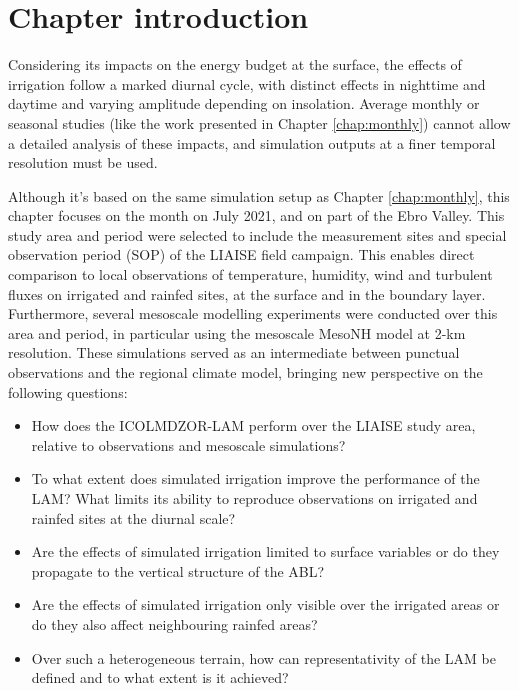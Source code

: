 \section{Chapter introduction}

Considering its impacts on the energy budget at the surface, the effects of irrigation follow a marked diurnal cycle, with distinct effects in nighttime and daytime and varying amplitude depending on insolation. 
Average monthly or seasonal studies (like the work presented in Chapter \ref{chap:monthly}) cannot allow a detailed analysis of these impacts, and simulation outputs at a finer temporal resolution must be used.

Although it's based on the same simulation setup as Chapter \ref{chap:monthly}, this chapter focuses on the month on July 2021, and on part of the Ebro Valley. This study area and period were selected to include the measurement sites and special observation period (SOP) of the LIAISE field campaign. This enables direct comparison to local observations of temperature, humidity, wind and turbulent fluxes on irrigated and rainfed sites, at the surface and in the boundary layer. Furthermore, several mesoscale modelling experiments were conducted over this area and period, in particular using the mesoscale MesoNH model at 2-km resolution. These simulations served as an intermediate between punctual observations and the regional climate model, bringing new perspective on the following questions:

\begin{itemize}
    \item How does the ICOLMDZOR-LAM perform over the LIAISE study area, relative to observations and mesoscale simulations?
    \item To what extent does simulated irrigation improve the performance of the LAM? What limits its ability to reproduce observations on irrigated and rainfed sites at the diurnal scale?
    \item Are the effects of simulated irrigation limited to surface variables or do they propagate to the vertical structure of the ABL? 
    \item Are the effects of simulated irrigation only visible over the irrigated areas or do they also affect neighbouring rainfed areas?
    \item Over such a heterogeneous terrain, how can representativity of the LAM be defined and to what extent is it achieved?
\end{itemize}

